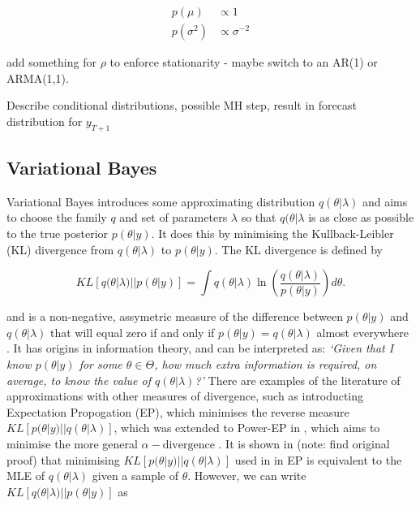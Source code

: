 \documentclass{article}\usepackage[]{graphicx}\usepackage[]{color}
\numberwithin{equation}{section}
\begin{document}
\begin{align}
p(\mu) &\propto 1 \nonumber \\
p(\sigma^2) &\propto \sigma^{-2} \nonumber
\end{align}

add something for $\rho$ to enforce stationarity - maybe switch to an AR(1) or ARMA(1,1).

Describe conditional distributions, possible MH step, result in forecast distribution for $y_{T+1}$

\subsection{Variational Bayes}

Variational Bayes introduces some approximating distribution $q(\theta | \lambda)$ and aims to choose the family $q$ and set of parameters $\lambda$ so that $q(\theta | \lambda$ is as close as possible to the true posterior $p(\theta | y)$. It does this by minimising the Kullback-Leibler (KL) divergence \citep{Kullback1951} from $q(\theta | \lambda)$ to $p(\theta | y)$. The KL divergence is defined by

\begin{equation}
\label{KL-def}
KL[q(\theta | \lambda)||p(\theta | y)] = \int q(\theta | \lambda) \ln \left( \frac{q(\theta | \lambda)}{p(\theta | y)}\right) d\theta.
\end{equation}

and is a non-negative, assymetric measure of the difference between $p(\theta | y)$ and $q(\theta | \lambda)$ that will equal zero if and only if $p(\theta | y) = q(\theta | \lambda)$ almost everywhere \citep{Bishop2006}. It has origins in information theory, and can be interpreted as: \textit{`Given that I know $p(\theta | y)$ for some $\theta \in \Theta$, how much extra information is required, on average, to know the value of $q(\theta | \lambda)$?'} There are examples of the literature of approximations with other measures of divergence, such as \citet{Minka2001} introducting Expectation Propogation (EP), which minimises the reverse measure $KL[p(\theta | y)||q(\theta |\lambda)]$, which was extended to Power-EP in \citet{Minka2004}, which aims to minimise the more general $\alpha-\mbox{divergence}$ \citep{Amari1985}. It is shown in \citet{Bishop2006} (note: find original proof) that minimising $KL[p(\theta | y)||q(\theta | \lambda)]$ used in in EP is equivalent to the MLE of $q(\theta | \lambda)$ given a sample of $\theta$. However, we can write $KL[q(\theta | \lambda)||p(\theta | y)]$ as
\end{document}
